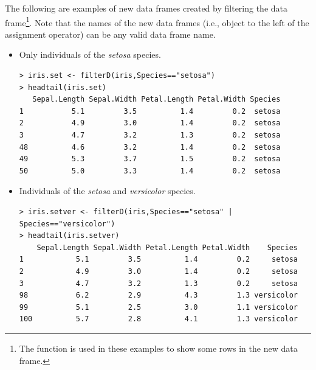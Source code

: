 \documentclass[10pt,openany]{book}\usepackage[]{graphicx}\usepackage[]{color}
\makeatletter
\newenvironment{kframe}{%
 \def\at@end@of@kframe{}%
 \ifinner\ifhmode%
  \def\at@end@of@kframe{\end{minipage}}%
  \begin{minipage}{\columnwidth}%
 \fi\fi%
 \def\FrameCommand##1{\hskip\@totalleftmargin \hskip-\fboxsep
 \colorbox{shadecolor}{##1}\hskip-\fboxsep
     \hskip-\linewidth \hskip-\@totalleftmargin \hskip\columnwidth}%
 \MakeFramed {\advance\hsize-\width
   \@totalleftmargin\z@ \linewidth\hsize
   \@setminipage}}%
 {\par\unskip\endMakeFramed%
 \at@end@of@kframe}
\newenvironment{knitrout}{}{} %
\makeatother
\begin{document}
The following are examples of new data frames created by filtering the  data frame\footnote{The  function is used in these examples to show some rows in the new data frame.}.  Note that the names of the new data frames (i.e., object to the left of the assignment operator) can be any valid data frame name.

\begin{itemize}
  \item Only individuals of the \emph{setosa} species.
\begin{knitrout}
\color{fgcolor}\begin{kframe}
\begin{verbatim}
> iris.set <- filterD(iris,Species=="setosa")
> headtail(iris.set)
   Sepal.Length Sepal.Width Petal.Length Petal.Width Species
1           5.1         3.5          1.4         0.2  setosa
2           4.9         3.0          1.4         0.2  setosa
3           4.7         3.2          1.3         0.2  setosa
48          4.6         3.2          1.4         0.2  setosa
49          5.3         3.7          1.5         0.2  setosa
50          5.0         3.3          1.4         0.2  setosa
\end{verbatim}
\end{kframe}
\end{knitrout}

  \item Individuals of the \emph{setosa} and \emph{versicolor} species.
\begin{knitrout}
\color{fgcolor}\begin{kframe}
\begin{verbatim}
> iris.setver <- filterD(iris,Species=="setosa" | Species=="versicolor")
> headtail(iris.setver)
    Sepal.Length Sepal.Width Petal.Length Petal.Width    Species
1            5.1         3.5          1.4         0.2     setosa
2            4.9         3.0          1.4         0.2     setosa
3            4.7         3.2          1.3         0.2     setosa
98           6.2         2.9          4.3         1.3 versicolor
99           5.1         2.5          3.0         1.1 versicolor
100          5.7         2.8          4.1         1.3 versicolor
\end{verbatim}
\end{kframe}
\end{knitrout}


\end{itemize}
\end{document}
